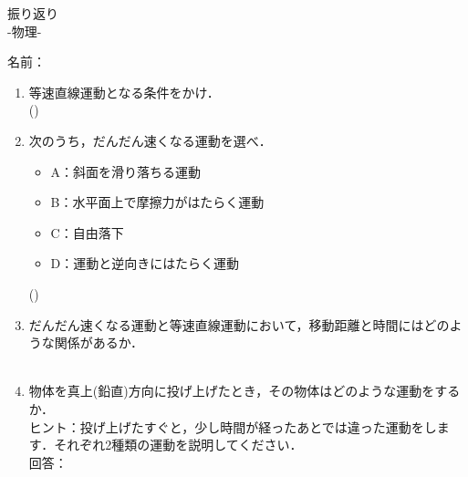 \documentclass[fontsize=15pt]{jlreq}
\newcommand{\m}[1]{\raisebox{0.1em}{\textcircled{\scriptsize #1}}}
\begin{document}
\begin{center}
{\LARGE {振り返り}} \\
-物理\m{2}- %
\end{center}
\vspace{1em}
\begin{flushright}
名前：\underline{\hspace{5cm}}
\end{flushright}

\begin{enumerate}
    \item 等速直線運動となる条件をかけ．\\
    (\hspace{15cm})
    \vspace{2em} 

    \item 次のうち，だんだん速くなる運動を選べ．
    \begin{itemize}
        \item A：斜面を滑り落ちる運動
        \item B：水平面上で摩擦力がはたらく運動
        \item C：自由落下
        \item D：運動と逆向きにはたらく運動
    \end{itemize}
    (\hspace{4cm})
    \vspace{2em} 

    \item \m{1}だんだん速くなる運動と\m{2}等速直線運動において，移動距離と時間にはどのような関係があるか．\\
    \m{1} \\[0.5em]
    \m{2}
    \vspace{2em} 

    \item 物体を真上(鉛直)方向に投げ上げたとき，その物体はどのような運動をするか．\\
    \small ヒント：投げ上げたすぐと，少し時間が経ったあとでは違った運動をします．それぞれ2種類の運動を説明してください．\\
    回答：
    \vspace{2em} 

\end{enumerate}
\end{document}
